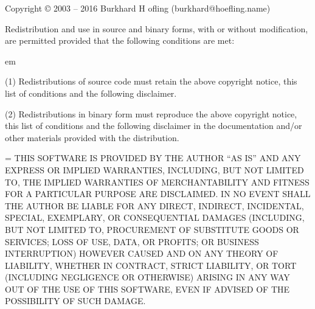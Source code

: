 

Copyright © 2003 -- 2016 Burkhard H{ o}fling (burkhard@hoefling.name)

Redistribution and use in source and binary forms, with or without
modification, are permitted provided that the following conditions are
met:

{ em
\item{(1)} Redistributions of source code must retain the above copyright
    notice, this list of conditions and the following disclaimer. 

\item{(2)} Redistributions in binary form must reproduce the above copyright
    notice, this list of conditions and the following disclaimer in
    the documentation and/or other materials provided with the
    distribution. \par}
    
{\emergencystretch=\hsize  {} 
THIS SOFTWARE IS PROVIDED BY THE AUTHOR ``AS IS'' AND ANY EXPRESS OR
IMPLIED WARRANTIES, INCLUDING, BUT NOT LIMITED TO, THE IMPLIED
WARRANTIES OF MERCHANTABILITY AND FITNESS FOR A PARTICULAR PURPOSE ARE
DISCLAIMED. IN NO EVENT SHALL THE AUTHOR BE LIABLE FOR ANY DIRECT,
INDIRECT, INCIDENTAL, SPECIAL, EXEMPLARY, OR CONSEQUENTIAL DAMAGES
(INCLUDING, BUT NOT LIMITED TO, PROCUREMENT OF SUBSTITUTE GOODS OR
SERVICES; LOSS OF USE, DATA, OR PROFITS; OR BUSINESS INTERRUPTION)
HOWEVER CAUSED AND ON ANY THEORY OF LIABILITY, WHETHER IN CONTRACT,
STRICT LIABILITY, OR TORT (INCLUDING NEGLIGENCE OR OTHERWISE) ARISING
IN ANY WAY OUT OF THE USE OF THIS SOFTWARE, EVEN IF ADVISED OF THE
POSSIBILITY OF SUCH DAMAGE.\par}

